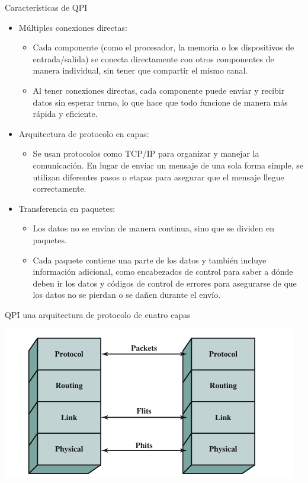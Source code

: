 \documentclass[presentation]{beamer}
\begin{document}
\begin{frame}[label={sec:org3f658f2}]{Características de QPI}
\begin{itemize}
\item \alert{\alert{Múltiples conexiones directas:}}
\begin{itemize}
\item Cada componente (como el procesador, la memoria o los dispositivos de entrada/salida) se conecta
directamente con otros componentes de manera individual, sin tener que compartir el mismo canal.
\item Al tener conexiones directas, cada componente puede enviar y recibir datos sin esperar turno,
lo que hace que todo funcione de manera más rápida y eficiente.
\end{itemize}
\item \alert{\alert{Arquitectura de protocolo en capas:}}
\begin{itemize}
\item Se usan protocolos como TCP/IP para organizar y manejar la comunicación. En lugar de enviar
un mensaje de una sola forma simple, se utilizan diferentes pasos o etapas para asegurar que el
mensaje llegue correctamente.
\end{itemize}
\item \alert{\alert{Transferencia en paquetes:}}
\begin{itemize}
\item Los datos no se envían de manera continua, sino que se dividen en paquetes.
\item Cada paquete contiene una parte de los datos y también incluye información adicional, como encabezados
de control para saber a dónde deben ir los datos y códigos de control de errores para asegurarse de que
los datos no se pierdan o se dañen durante el envío.
\end{itemize}
\end{itemize}
\end{frame}


\begin{frame}[label={sec:org6edac9c}]{QPI una arquitectura de protocolo de cuatro capas}
\begin{center}
\includegraphics[width=.9\linewidth]{./Images/QPI.png}
\end{center}    
\end{frame}
\end{document}
